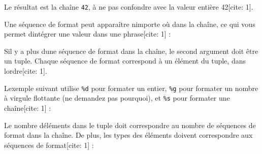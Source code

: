 Le résultat est la chaîne
\texttt{\textquotesingle{}42\textquotesingle{}}, à ne pas confondre avec
la valeur entière 42{[}cite: 1{]}.

Une séquence de format peut apparaître n\textquotesingle importe où dans
la chaîne, ce qui vous permet d\textquotesingle intégrer une valeur dans
une phrase{[}cite: 1{]} :

\begin{Shaded}
\begin{Highlighting}[]
\OperatorTok{\textgreater{}\textgreater{}\textgreater{}}\OperatorTok{=} 
\OperatorTok{\textgreater{}\textgreater{}\textgreater{}}  \OperatorTok{\%}
\end{Highlighting}
\end{Shaded}

S\textquotesingle il y a plus d\textquotesingle une séquence de format
dans la chaîne, le second argument doit être un tuple. Chaque séquence
de format correspond à un élément du tuple, dans
l\textquotesingle ordre{[}cite: 1{]}.

L\textquotesingle exemple suivant utilise
\texttt{\textquotesingle{}\%d\textquotesingle{}} pour formater un
entier, \texttt{\textquotesingle{}\%g\textquotesingle{}} pour formater
un nombre à virgule flottante (ne demandez pas pourquoi), et
\texttt{\textquotesingle{}\%s\textquotesingle{}} pour formater une
chaîne{[}cite: 1{]} :

\begin{Shaded}
\begin{Highlighting}[]
\OperatorTok{\textgreater{}\textgreater{}\textgreater{}} \StringTok{ } \OperatorTok{\%}\NormalTok{ (}\NormalTok{, }\NormalTok{, }\NormalTok{)}
\end{Highlighting}
\end{Shaded}

Le nombre d\textquotesingle éléments dans le tuple doit correspondre au
nombre de séquences de format dans la chaîne. De plus, les types des
éléments doivent correspondre aux séquences de format{[}cite: 1{]} :

